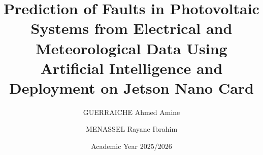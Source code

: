 \usepackage{fancyhdr}
\pagestyle{plain}

\usepackage[font={small,it},labelfont=bf]{caption}

\usepackage[round]{natbib}         %

\usepackage{algorithm}
\usepackage{algpseudocode}
\usepackage{listings}
\lstset{
    basicstyle=\ttfamily\small,
    breaklines=true,
    frame=single,
    numbers=left,
    numberstyle=\tiny,
    xleftmargin=2em,
    framexleftmargin=1.5em
}

\usepackage[capitalise,noabbrev]{cleveref}

\usepackage[toc,page]{appendix}

\newcommand{\R}{\mathbb{R}}
\newcommand{\N}{\mathbb{N}}
\newcommand{\Z}{\mathbb{Z}}
\newcommand{\todo}[1]{\textcolor{red}{\textbf{[TODO: #1]}}}
\newcommand{\note}[1]{\textcolor{blue}{\textbf{[Note: #1]}}}

\title{Prediction of Faults in Photovoltaic Systems from Electrical and Meteorological Data Using Artificial Intelligence and Deployment on Jetson Nano Card}
\author{GUERRAICHE Ahmed Amine \and MENASSEL Rayane Ibrahim}
\date{Academic Year 2025/2026}

\setcounter{secnumdepth}{3}
\setcounter{tocdepth}{3}

